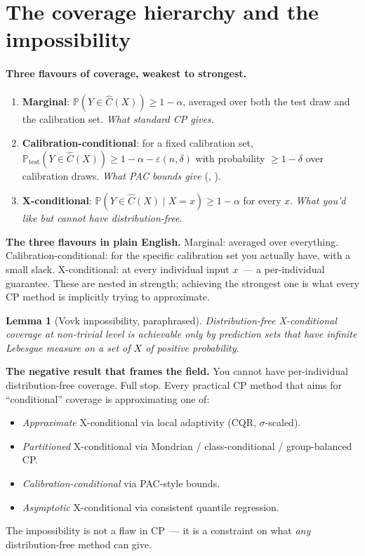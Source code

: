 \documentclass[letterpaper,11pt,leqno]{article}
\newtheorem*{lemstar}{Lemma}
\begin{document}
\section{The coverage hierarchy and the impossibility}\label{s:hierarchy}

\paragraph{Three flavours of coverage, weakest to strongest.}
\begin{enumerate}
\item \textbf{Marginal}: $\mathbb{P}(Y \in \hat{C}(X)) \geq 1-\alpha$, averaged over both the test draw and the calibration set. \emph{What standard CP gives.}
\item \textbf{Calibration-conditional}: for a fixed calibration set, $\mathbb{P}_{\text{test}}(Y \in \hat{C}(X)) \geq 1-\alpha-\varepsilon(n,\delta)$ with probability $\geq 1-\delta$ over calibration draws. \emph{What PAC bounds give} (\cite{vovk2012conditional}, \cite{bian2023calibration}).
\item \textbf{X-conditional}: $\mathbb{P}(Y \in \hat{C}(X) \mid X = x) \geq 1-\alpha$ for every $x$. \emph{What you'd like but cannot have distribution-free}.
\end{enumerate}

\begin{definitionexplain}
\textbf{The three flavours in plain English.} Marginal: averaged over everything. Calibration-conditional: for the specific calibration set you actually have, with a small slack. X-conditional: at every individual input $x$~--- a per-individual guarantee. These are nested in strength; achieving the strongest one is what every CP method is implicitly trying to approximate.
\end{definitionexplain}

\begin{lemstar}[Vovk impossibility, paraphrased]
Distribution-free X-conditional coverage at non-trivial level is achievable only by prediction sets that have infinite Lebesgue measure on a set of $X$ of positive probability.
\end{lemstar}

\begin{whymatters}
\textbf{The negative result that frames the field.} You cannot have per-individual distribution-free coverage. Full stop. Every practical CP method that aims for ``conditional'' coverage is approximating one of:
\begin{itemize}
\item \emph{Approximate} X-conditional via local adaptivity (CQR, $\sigma$-scaled).
\item \emph{Partitioned} X-conditional via Mondrian / class-conditional / group-balanced CP.
\item \emph{Calibration-conditional} via PAC-style bounds.
\item \emph{Asymptotic} X-conditional via consistent quantile regression.
\end{itemize}
The impossibility is not a flaw in CP~--- it is a constraint on what \emph{any} distribution-free method can give.
\end{whymatters}
\end{document}
